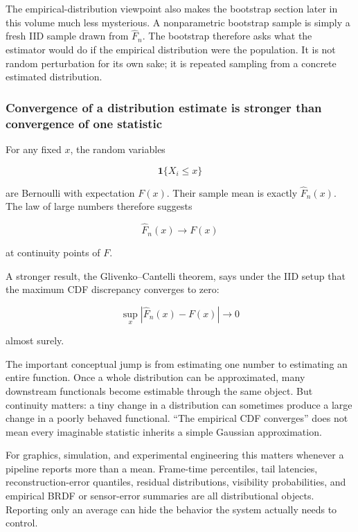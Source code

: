 The empirical-distribution viewpoint also makes the bootstrap section later in this volume much less mysterious. A nonparametric bootstrap sample is simply a fresh IID sample drawn from \(\widehat F_n\). The bootstrap therefore asks what the estimator would do if the empirical distribution were the population. It is not random perturbation for its own sake; it is repeated sampling from a concrete estimated distribution.

\subsubsection{Convergence of a distribution estimate is stronger than convergence of one statistic}\label{02-foundations-ii-ch030-convergence-of-a-distribution-estimate-is-stronger-than-convergence-of-one-statistic}

\hypertarget{02-foundations-ii-ch030-convergence-of-a-distribution-estimate-is-stronger-than-convergence-of-one-statistic}{}

For any fixed \(x\), the random variables

\[
\mathbf 1\{X_i\le x\}
\]

are Bernoulli with expectation \(F(x)\). Their sample mean is exactly \(\widehat F_n(x)\). The law of large numbers therefore suggests

\[
\widehat F_n(x)\to F(x)
\]

at continuity points of \(F\).

A stronger result, the Glivenko--Cantelli theorem, says under the IID setup that the maximum CDF discrepancy converges to zero:

\[
\boxed{
\sup_x
\left|
\widehat F_n(x)-F(x)
\right|
\longrightarrow 0
}
\]

almost surely.

The important conceptual jump is from estimating one number to estimating an entire function. Once a whole distribution can be approximated, many downstream functionals become estimable through the same object. But continuity matters: a tiny change in a distribution can sometimes produce a large change in a poorly behaved functional. ``The empirical CDF converges'' does not mean every imaginable statistic inherits a simple Gaussian approximation.

For graphics, simulation, and experimental engineering this matters whenever a pipeline reports more than a mean. Frame-time percentiles, tail latencies, reconstruction-error quantiles, residual distributions, visibility probabilities, and empirical BRDF or sensor-error summaries are all distributional objects. Reporting only an average can hide the behavior the system actually needs to control.

